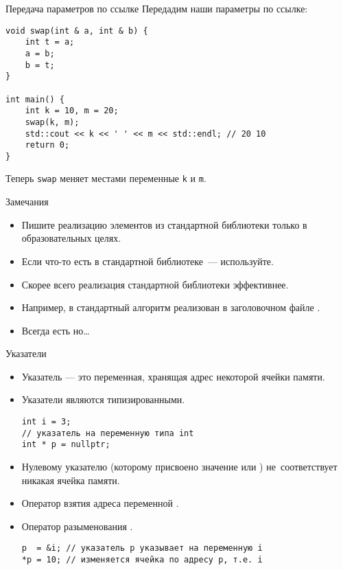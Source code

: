 \documentclass{beamer}
\begin{document}
\begin{frame}[fragile]{Передача параметров по ссылке}
    Передадим наши параметры по ссылке:
    \begin{lstlisting}
void swap(int & a, int & b) {
    int t = a;
    a = b;
    b = t;
}

int main() {
    int k = 10, m = 20;
    swap(k, m);
    std::cout << k << ' ' << m << std::endl; // 20 10
    return 0;
}
    \end{lstlisting}
    Теперь {\tt swap} меняет местами переменные {\tt k} и {\tt m}.
\end{frame}

\begin{frame}[fragile]{Замечания}
    \begin{itemize}
        \item Пишите реализацию элементов из стандартной библиотеки только в образовательных целях.
        \item Если что-то есть в стандартной библиотеке~--- используйте.
        \item Скорее всего реализация стандартной библиотеки эффективнее.
        \item Например, в стандартный алгоритм  реализован в заголовочном файле .
        \item Всегда есть но\dots
    \end{itemize}
\end{frame}

\begin{frame}[fragile]{Указатели}
    \begin{itemize}
        \item Указатель — это переменная, хранящая адрес некоторой 
            ячейки памяти.
        \item Указатели являются типизированными.
\begin{lstlisting}
int i = 3;
// указатель на переменную типа int
int * p = nullptr;
\end{lstlisting}
        \item Нулевому указателю (которому присвоено значение  или ) не~соответствует никакая ячейка памяти.
        \item Оператор взятия адреса переменной \code{\&}.
        \item Оператор разыменования \code{*}.
            \begin{lstlisting}
p  = &i; // указатель p указывает на переменную i
*p = 10; // изменяется ячейка по адресу p, т.е. i
            \end{lstlisting}
    \end{itemize}
\end{frame}
\end{document}
